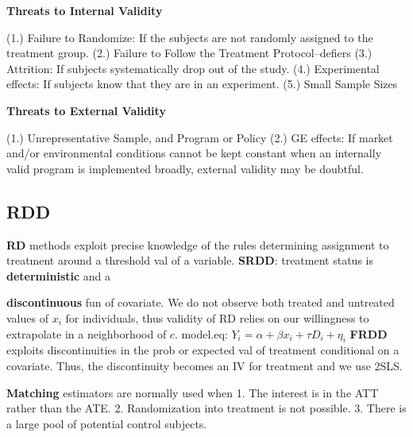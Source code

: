 \documentclass[
]{article}
\begin{document}
\textbf{Threats to Internal Validity}

(1.) Failure to Randomize: If the subjects are not randomly assigned to
the treatment group. (2.) Failure to Follow the Treatment
Protocol--defiers (3.) Attrition: If subjects systematically drop out of
the study. (4.) Experimental effects: If subjects know that they are in
an experiment. (5.) Small Sample Sizes

\textbf{Threats to External Validity}

(1.) Unrepresentative Sample, and Program or Policy (2.) GE effects: If
market and/or environmental conditions cannot be kept constant when an
internally valid program is implemented broadly, external validity may
be doubtful.

\hypertarget{rdd}{%
\subsection{RDD}\label{rdd}}

\textbf{RD} methods exploit precise knowledge of the rules determining
assignment to treatment around a threshold val of a variable.
\textbf{SRDD}: treatment status is \textbf{deterministic} and a

\textbf{discontinuous} fun of covariate. We do not observe both treated
and untreated values of \(x_{i}\) for individuals, thus validity of
\(\mathrm{RD}\) relies on our willingness to extrapolate in a
neighborhood of \(c\). model.eq:
\(Y_{i}=\alpha+\beta x_{i}+\tau D_{i}+\eta_{i}\) \textbf{FRDD} exploits
discontinuities in the prob or expected val of treatment conditional on
a covariate. Thus, the discontinuity becomes an IV for treatment and we
use 2SLS.

\textbf{Matching} estimators are normally used when 1. The interest is
in the ATT rather than the ATE. 2. Randomization into treatment is not
possible. 3. There is a large pool of potential control subjects.
\end{document}
